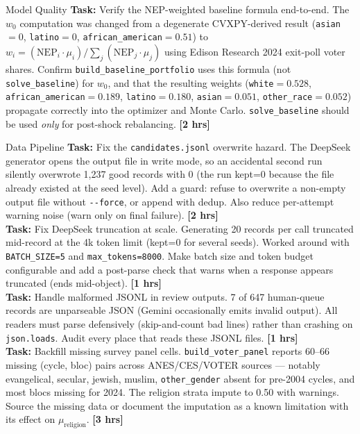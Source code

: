 \documentclass[11pt]{article}
\newcommand{\hrs}[1]{\textbf{[#1 hrs]}}
\newcommand{\task}[2]{%
  \noindent\textbf{Task:} #1 \hfill \hrs{#2}\\}
\begin{document}
\begin{taskbox}{Model Quality}
\task{Verify the NEP-weighted baseline formula end-to-end. The $w_0$
  computation was changed from a degenerate CVXPY-derived result
  (\texttt{asian}$=0$, \texttt{latino}$=0$, \texttt{african\_american}$=0.51$)
  to $w_i = (\mathrm{NEP}_i \cdot \mu_i) / \sum_j(\mathrm{NEP}_j \cdot \mu_j)$
  using Edison Research 2024 exit-poll voter shares. Confirm
  \texttt{build\_baseline\_portfolio} uses this formula (not
  \texttt{solve\_baseline}) for $w_0$, and that the resulting weights
  (\texttt{white}$=0.528$, \texttt{african\_american}$=0.189$,
  \texttt{latino}$=0.180$, \texttt{asian}$=0.051$,
  \texttt{other\_race}$=0.052$) propagate correctly into the optimizer and
  Monte Carlo. \texttt{solve\_baseline} should be used \emph{only} for
  post-shock rebalancing.}{2}
\end{taskbox}

\begin{taskbox}{Data Pipeline}
\task{Fix the \texttt{candidates.jsonl} overwrite hazard. The DeepSeek
  generator opens the output file in write mode, so an accidental second run
  silently overwrote 1,237 good records with 0 (the run kept=0 because the
  file already existed at the seed level). Add a guard: refuse to overwrite a
  non-empty output file without \texttt{-{}-force}, or append with dedup.
  Also reduce per-attempt warning noise (warn only on final failure).}{2}

\task{Fix DeepSeek truncation at scale. Generating 20 records per call
  truncated mid-record at the 4k token limit (kept=0 for several seeds).
  Worked around with \texttt{BATCH\_SIZE=5} and \texttt{max\_tokens=8000}.
  Make batch size and token budget configurable and add a post-parse check
  that warns when a response appears truncated (ends mid-object).}{1}

\task{Handle malformed JSONL in review outputs. 7 of 647 human-queue records
  are unparseable JSON (Gemini occasionally emits invalid output). All readers
  must parse defensively (skip-and-count bad lines) rather than crashing on
  \texttt{json.loads}. Audit every place that reads these JSONL files.}{1}

\task{Backfill missing survey panel cells. \texttt{build\_voter\_panel} reports
  60--66 missing (cycle, bloc) pairs across ANES/CES/VOTER sources --- notably
  evangelical, secular, jewish, muslim, \texttt{other\_gender} absent for
  pre-2004 cycles, and most blocs missing for 2024. The religion strata impute
  to 0.50 with warnings. Source the missing data or document the imputation as
  a known limitation with its effect on $\mu_{\mathrm{religion}}$.}{3}
\end{taskbox}
\end{document}
